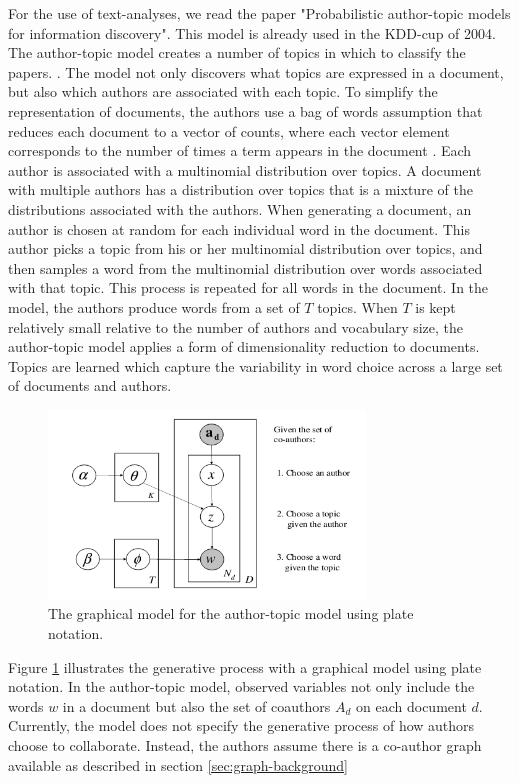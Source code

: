 

For the use of text-analyses, we read the paper "Probabilistic author-topic models for information discovery". This model is already used in the KDD-cup of 2004. The author-topic model creates a number of topics in which to classify the papers.  \cite{steyvers2004probabilistic}. The model not only discovers what topics are expressed in a document, but also which authors are associated with each topic. To simplify the representation of documents, the authors use a bag of words assumption that reduces each document to a vector of counts, where each vector element corresponds to the number of times a term appears in the document \cite{chowdhury2010introduction}. Each author is associated with a multinomial distribution over topics. A document with multiple authors has a distribution over topics that is a mixture of the distributions associated with the authors. When generating a document, an author is chosen at random for each individual word in the document. This author picks a topic from his or her multinomial distribution over topics, and then samples a word from the multinomial distribution over words associated with that topic. This process is repeated for all words in the document. In the model, the authors produce words from a set of $T$ topics. When $T$ is kept relatively small relative to the number of authors and vocabulary size, the author-topic model applies a form of dimensionality reduction to documents. Topics are learned which capture the variability in word choice across a large set of documents and authors. 

\begin{figure}[htb]
\begin{center}
	\centering
	\includegraphics[width=0.75\textwidth]{./Images/model.png}
	\caption{The graphical model for the author-topic
model using plate notation.\cite{steyvers2004probabilistic} \label{fig:model}}
\end{center}
\end{figure}

Figure \ref{fig:model} illustrates the generative process with a graphical model using plate notation. In the author-topic model, observed variables not only include the words $w$ in a document but also the set of coauthors $A_d$ on each document $d$. Currently, the model does not specify the generative process of how authors choose to collaborate. Instead, the authors assume there is a co-author graph available as described in section \ref{sec:graph-background}
